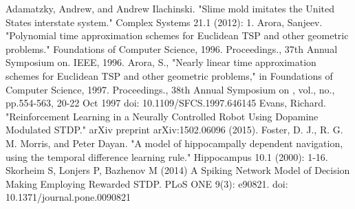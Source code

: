 \documentclass[conference]{IEEEtran}
\begin{document}
%
%

\begin{thebibliography}{1}
Adamatzky, Andrew, and Andrew Ilachinski. "Slime mold imitates the United States interstate system." Complex Systems 21.1 (2012): 1.
Arora, Sanjeev. "Polynomial time approximation schemes for Euclidean TSP and other geometric problems." Foundations of Computer Science, 1996. Proceedings., 37th Annual Symposium on. IEEE, 1996.
Arora, S., "Nearly linear time approximation schemes for Euclidean TSP and other geometric problems," in Foundations of Computer Science, 1997. Proceedings., 38th Annual Symposium on , vol., no., pp.554-563, 20-22 Oct 1997
doi: 10.1109/SFCS.1997.646145
Evans, Richard. "Reinforcement Learning in a Neurally Controlled Robot Using Dopamine Modulated STDP." arXiv preprint arXiv:1502.06096 (2015).
Foster, D. J., R. G. M. Morris, and Peter Dayan. "A model of hippocampally dependent navigation, using the temporal difference learning rule." Hippocampus 10.1 (2000): 1-16.
Skorheim S, Lonjers P, Bazhenov M (2014) A Spiking Network Model of Decision Making Employing Rewarded STDP. PLoS ONE 9(3): e90821. doi: 10.1371/journal.pone.0090821
\end{thebibliography}




\end{document}
